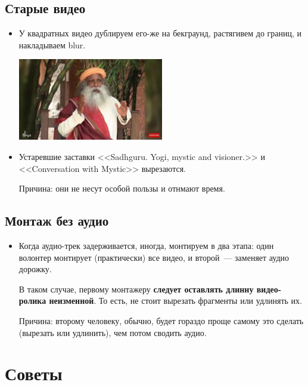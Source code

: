 \documentclass[
a4paper, %
12pt, %
article,
onecolumn, %
openany, %
]{memoir}
\begin{document}
\subsection{Старые видео}

\begin{itemize}

    \item У квадратных видео дублируем его-же на бекграунд, растягивем до границ,
        и накладываем blur.
        \begin{center} \includegraphics[width=0.5\textwidth]{tooWide}  \end{center}

    \item Устаревшие заставки <<Sadhguru. Yogi, mystic and visioner.>> и
        <<Conversation with Mystic>> вырезаются.

        {\color{gray}Причина: они не несут особой пользы и отнмают время.}
\end{itemize}


\subsection{Монтаж без аудио}

\begin{itemize}
    \item Когда аудио-трек задерживается, иногда, монтируем в два
        этапа: один волонтер монтирует (практически) все видео, и
        второй~--- заменяет аудио дорожку.

        В таком случае, первому монтажеру \textbf{следует оставлять
        длинну видео-ролика неизменной}. То есть, не стоит вырезать
        фрагменты или удлинять их.

        Причина: второму человеку, обычно, будет гораздо проще
        самому это сделать (вырезать или удлинить), чем потом сводить аудио.
\end{itemize}

\newpage
\section{Советы}\label{advices}
\end{document}
